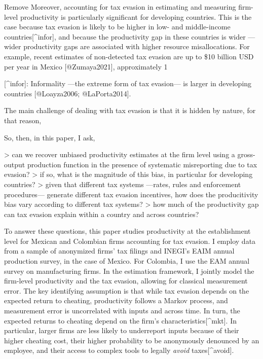 \documentclass[
  12pt]{article}
\theoremstyle{definition}
\theoremstyle{remark}
\begin{document}
\begin{anfxnote*}{Remove}
Moreover, accounting for tax evasion in estimating and measuring firm-level productivity is particularly significant for developing countries. This is the case because tax evasion is likely to be higher in low- and middle-income countries[^infor], and because the productivity gap in these countries is wider —wider productivity gaps are associated with higher resource misallocations. For example, recent estimates of non-detected tax evasion are up to \$10 billion USD per year in Mexico [@Zumaya2021], approximately 1%

[^infor]: Informality —the extreme form of tax evasion— is larger in developing countries [@Loayza2006; @LaPorta2014].

The main challenge of dealing with tax evasion is that it is hidden by nature, for that reason, 


So, then, in this paper, I ask, 

> can we recover unbiased productivity estimates at the firm level using a gross-output production function in the presence of systematic misreporting due to tax evasion?
> if so, what is the magnitude of this bias, in particular for developing countries?
> given that different tax systems —rates, rules and enforcement procedures— generate different tax evasion incentives, how does the producitivity bias vary according to different tax systems? 
> how much of the productivity gap can tax evasion explain within a country and across countries?

To answer these questions, this paper studies productivity at the establishment level for Mexican and Colombian firms accounting for tax evasion. I employ data from a sample of anonymized firms' tax filings and INEGI's EAIM annual production survey, in the case of Mexico. For Colombia, I use the EAM annual survey on manufacturing firms. In the estimation framework, I jointly model the firm-level productivity and the tax evasion, allowing for classical measurement error. The key identifying assumption is that while tax evasion depends on the expected return to cheating, productivity follows a Markov process, and measurement error is uncorrelated with inputs and across time. In turn, the expected returns to cheating depend on the firm's characteristics[^mkt]. In particular, larger firms are less likely to underreport inputs because of their higher cheating cost, their higher probability to be anonymously denounced by an employee, and their access to complex tools to legally \emph{avoid} taxes[^avoid].


\end{anfxnote*}
\end{document}
